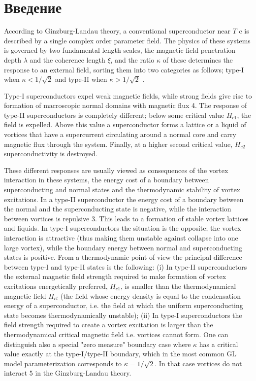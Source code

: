 \chapter{Введение}
\label{ch:1}

According to Ginzburg-Landau theory, a conventional superconductor near 
\( T \) c is described by a single complex order parameter field. The physics 
of these systems is governed by two fundamental length scales, the magnetic
field penetration depth \( \lambda \) and the coherence length \( \xi \), and
the ratio \( \kappa \) of these determines the response to an external
field, sorting them into two categories as follows; type-I when 
\( \kappa < 1/\sqrt{2} \) and type-II when \( \kappa > 1/\sqrt{2} \)
\footnotemark[3].

Type-I superconductors expel weak magnetic fields, while strong fields give 
rise to formation of macroscopic normal domains with magnetic flux 4. The 
response of type-II superconductors is completely different; below some 
critical value \( H_{c1} \), the field is expelled. Above this value a 
superconductor forms a lattice or a liquid of vortices that have a 
supercurrent circulating around a normal core and carry magnetic flux through 
the system. Finally, at a higher second critical value, \( H_{c2} \) 
superconductivity is destroyed. 

These different responses are usually viewed as consequences of the vortex 
interaction in these systems, the energy cost of a boundary between 
superconducting and normal states and the thermodynamic stability of vortex 
excitations. In a type-II superconductor the energy cost of a boundary between 
the normal and the superconducting state is negative, while the interaction 
between vortices is repulsive 3. This leads to a formation of stable vortex 
lattices and liquids. In type-I superconductors the situation is the opposite; 
the vortex interaction is attractive (thus making them unstable against 
collapse into one large vortex), while the boundary energy between normal and 
superconducting states is positive. From a thermodynamic point of view the 
principal difference between type-I and type-II states is the following: (i) 
In type-II superconductors the external magnetic field strength required to 
make formation of vortex excitations energetically preferred, \( H_{c1} \), 
is smaller than the thermodynamical magnetic field \( H_{ct} \) (the field 
whose energy density is equal to the condensation energy of a superconductor, 
i.e. the field at which the uniform superconducting state becomes 
thermodynamically unstable); (ii) In type-I superconductors the field strength 
required to create a vortex excitation is larger than the thermodynamical 
critical magnetic field i.e. vortices cannot form. One can distinguish also a 
special "zero measure" boundary case where \( \kappa \) has a critical value 
exactly at the type-I/type-II boundary, which in the most common GL model 
parameterization corresponds to \( \kappa = 1/\sqrt{2} \). In that case 
vortices do not interact 5 in the Ginzburg-Landau theory. 

